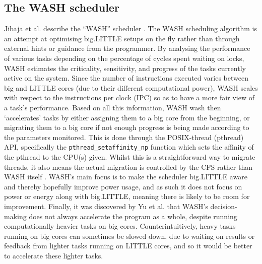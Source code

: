     \subsection{The WASH scheduler}
    Jibaja et al. describe the ``WASH'' scheduler \cite{jibaja_portable_2016}. 
    The WASH scheduling algorithm is an attempt at optimising big.LITTLE setups 
    on the fly rather than through external hints or guidance from the 
    programmer. By analysing the performance of various tasks depending on the 
    percentage of cycles spent waiting on locks, WASH estimates the 
    criticality, sensitivity, and progress of the tasks currently active on the 
    system. Since the number of instructions executed varies between big and 
    LITTLE cores (due to their different computational power), WASH scales with 
    respect to the instructions per clock (IPC) so as to have a more fair view 
    of a task's performance. Based on all this information, WASH wash then 
    `accelerates' tasks by either assigning them to a big core from the 
    beginning, or migrating them to a big core if not enough progress is being 
    made according to the parameters monitored. This is done through the 
    POSIX-thread (pthread) API, specifically the 
    \texttt{pthread\_setaffinity\_np} function which sets the affinity of the 
    pthread to the CPU(s) given. Whilst this is a straightforward way to migrate
    threads, it also means the actual migration is controlled by the CFS rather
    than WASH itself \cite{yu_colab_2020}. WASH's main focus is to make the
    scheduler big.LITTLE aware and thereby hopefully improve power usage, and as
    such it does not focus on power or energy along with big.LITTLE, meaning 
    there is likely to be room for improvement. Finally, it was discovered by 
    Yu et al. \cite{yu_colab_2020} that WASH's decision-making does not always 
    accelerate the program as a whole, despite running computationally heavier 
    tasks on big cores. Counterintuitively, heavy tasks running on big cores can
    sometimes be slowed down, due to waiting on results or feedback from lighter
    tasks running on LITTLE cores, and so it would be better to accelerate these
    lighter tasks.
    

